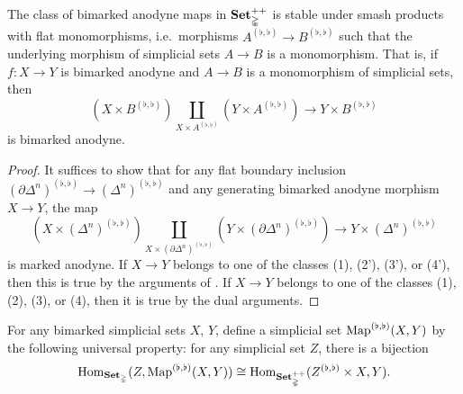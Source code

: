 \documentclass[main.tex]{subfiles}
\begin{document}
\begin{lemma}
  \label{lemma:smash_product_of_bimarked_anodyne_and_monic_is_bimarked_anodyne}
  The class of bimarked anodyne maps in $\mathbf{Set}_{\mathbb{\Delta}}^{++}$ is stable under smash products with flat monomorphisms, i.e.\ morphisms $A^{(\flat, \flat)} \to B^{(\flat, \flat)}$ such that the underlying morphism of simplicial sets $A \to B$ is a monomorphism. That is, if $f\colon X \to Y$ is bimarked anodyne and $A \to B$ is a monomorphism of simplicial sets, then
  \begin{equation*}
    (X \times B^{(\flat, \flat)}) \coprod_{X \times A^{(\flat, \flat)}} (Y \times A^{(\flat, \flat)}) \to Y \times B^{(\flat, \flat)}
  \end{equation*}
  is bimarked anodyne.
\end{lemma}
\begin{proof}
  It suffices to show that for any flat boundary inclusion $(\partial \Delta^{n})^{(\flat, \flat)} \to (\Delta^{n})^{(\flat, \flat)}$ and any generating bimarked anodyne morphism $X \to Y$, the map
  \begin{equation*}
    (X \times (\Delta^{n})^{(\flat, \flat)}) \coprod_{X \times (\partial \Delta^{n})^{(\flat, \flat)}} (Y \times (\partial\Delta^{n})^{(\flat, \flat)}) \to Y \times (\Delta^{n})^{(\flat, \flat)}
  \end{equation*}
  is marked anodyne. If $X \to Y$ belongs to one of the classes (1), (2'), (3'), or (4'), then this is true by the arguments of \cite[Prop.\ 3.1.2.3]{highertopostheory}. If $X \to Y$ belongs to one of the classes (1), (2), (3), or (4), then it is true by the dual arguments.
\end{proof}

\begin{definition}
  For any bimarked simplicial sets $X$, $Y$, define a simplicial set $\mathrm{Map}^{(\flat, \flat)}(X, Y)$ by the following universal property: for any simplicial set $Z$, there is a bijection
  \begin{equation*}
    \mathrm{Hom}_{\mathbf{Set}_{\mathbb{\Delta}}}(Z, \mathrm{Map}^{(\flat, \flat)}(X, Y)) \cong \mathrm{Hom}_{\mathbf{Set}_{\mathbb{\Delta}}^{++}}(Z^{(\flat, \flat)} \times X, Y).
  \end{equation*}
\end{definition}
\end{document}
